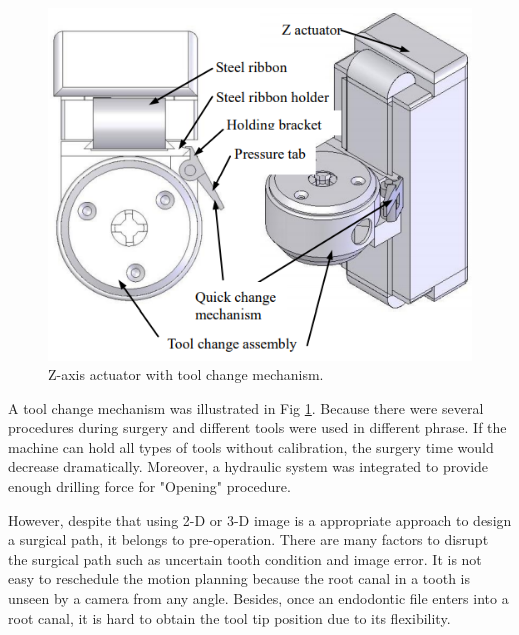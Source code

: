 \begin{figure}[htbp]
\begin{center}
\includegraphics[width=0.7\linewidth]{Images/NCTU_3.png}
\caption[Z-axis actuator with tool change mechanism.]{
Z-axis actuator with tool change mechanism. \cite{dong2010design}
}\label{fig:NCTU_3}
\end{center}
\end{figure}
\par
A tool change mechanism was illustrated in Fig \ref{fig:NCTU_3}. Because there were several procedures during surgery and different tools were used in different phrase. If the machine can hold all types of tools without calibration, the surgery time would decrease dramatically.  Moreover, a hydraulic system was integrated to provide enough drilling force for "Opening" procedure.
\par
However, despite that using 2-D or 3-D image is a appropriate approach to design a surgical path, it belongs to pre-operation. There are many factors to disrupt the surgical path such as uncertain tooth condition and image error. It is not easy to reschedule the motion planning because the root canal in a tooth is unseen by a camera from any angle. Besides, once an endodontic file enters into a root canal, it is hard to obtain the tool tip position due to its flexibility. 
